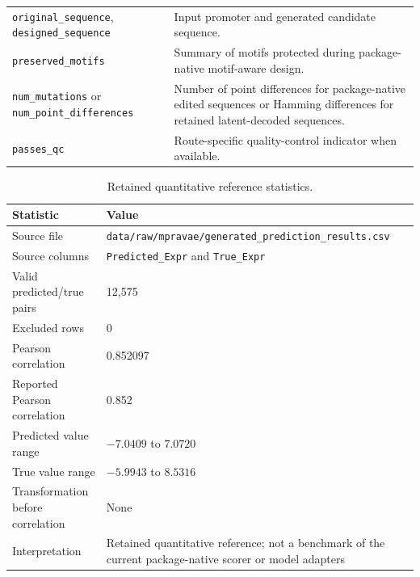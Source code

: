 \documentclass[10pt]{article}
\begin{document}
\begin{longtable}{L{0.22\textwidth}L{0.66\textwidth}}
\texttt{original\allowbreak\_sequence}, \texttt{designed\allowbreak\_sequence} 
& Input promoter and generated candidate sequence. \\

\texttt{preserved\allowbreak\_motifs} 
& Summary of motifs protected during package-native motif-aware design. \\

\texttt{num\allowbreak\_mutations} or \texttt{num\allowbreak\_point\allowbreak\_differences} 
& Number of point differences for package-native edited sequences or Hamming differences for retained latent-decoded sequences. \\

\texttt{passes\allowbreak\_qc} 
& Route-specific quality-control indicator when available. \\

\bottomrule
\end{longtable}


\begin{table}[H]
\centering
\caption{Retained quantitative reference statistics.}\label{tab:quant-reference}

\begin{tabular}{p{}p{}}
\toprule
Statistic & Value \\
\midrule

Source file 
& \texttt{data/raw/mpravae/generated\_prediction\_results.csv} \\

Source columns 
& \texttt{Predicted\_Expr} and \texttt{True\_Expr} \\

Valid predicted/true pairs 
& 12,575 \\

Excluded rows 
& 0 \\

Pearson correlation 
& 0.852097 \\

Reported Pearson correlation 
& 0.852 \\

Predicted value range 
& \(-7.0409\) to \(7.0720\) \\

True value range 
& \(-5.9943\) to \(8.5316\) \\

Transformation before correlation 
& None \\

Interpretation 
& Retained quantitative reference; not a benchmark of the current package-native scorer or model adapters \\

\bottomrule
\end{tabular}
\end{table}
\end{document}
